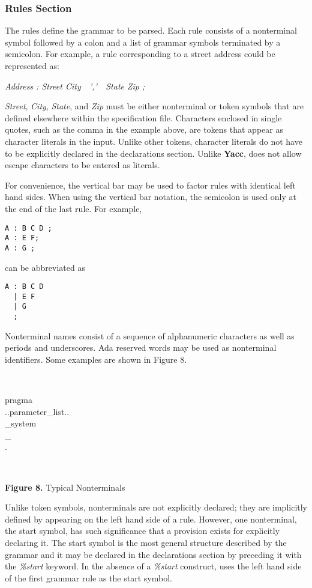 \subsubsection{Rules Section}
The rules
define the grammar to be parsed.  Each rule consists of a
nonterminal symbol followed by a colon and
a list of grammar symbols
terminated by a semicolon.  For example, a rule corresponding
to a street address could be represented as:

{\centerline{\it Address : Street City\ \ ','\ \ State Zip ;}}

{\it Street}, {\it City}, {\it State}, and {\it Zip} must be either
nonterminal or token symbols that are defined elsewhere within the
specification file.  Characters enclosed in single quotes, such
as the comma in the example above, are tokens that appear
as character literals in the input.  Unlike other tokens, character
literals do not have to be explicitly declared in the
declarations section.  Unlike {\bf Yacc}, \ayacc does not allow escape
characters to be entered as literals.

For convenience, the vertical bar may be used to factor rules
with identical left hand sides.  When using the vertical bar
notation, the semicolon is used only at the end of the last rule.  For
example,

\begin{verbatim}
A : B C D ;
A : E F;
A : G ;
\end{verbatim}
can be abbreviated as
\begin{verbatim}
A : B C D
  | E F
  | G
  ;
\end{verbatim}
Nonterminal names consist of a sequence of alphanumeric characters
as well as periods and underscores.  Ada reserved words may be used
as nonterminal identifiers.  Some examples are shown in Figure 8.

\noindent\hspace{-0.05in}\hrulefill\hspace{0.0in}\\
\vspace{-0.2in}
\begin{center}
pragma\\
..parameter\_list..\\
\_system\\
\_\\
.\\
\end{center}
\hspace{-0.05in}\hrulefill\hspace{0.0in}\\
\centerline{{\bf Figure 8.} Typical Nonterminals}
Unlike token symbols, nonterminals are not explicitly declared;
they are  implicitly defined by appearing on the left hand side
of a rule.  However, one nonterminal, the start symbol, has
such significance that a provision exists for explicitly
declaring it.  The start symbol is the most general
structure described by the grammar and it may be declared in
the declarations section by preceding it with the
{\it \%start}
keyword.  In the absence of a
{\it \%start}
construct, \ayacc
uses the left hand side of the first grammar rule as
the start symbol.

